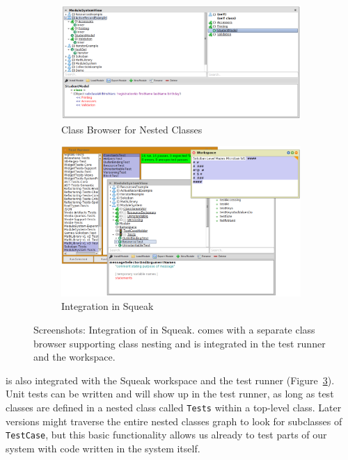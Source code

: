 \begin{figure}[!htp]
	\centering
	\begin{subfigure}[b]{\textwidth}
	\includegraphics[width=\textwidth]{screenshot_classbrowser.png}
	\caption{Class Browser for Nested Classes}
	\label{fig:impl_class_browser}
	\end{subfigure}

	\vspace{20pt}

	\begin{subfigure}[b]{\textwidth}
	\includegraphics[width=\textwidth]{screenshot_integration.png}
	\caption{Integration in Squeak}
	\label{fig:impl_integration}
	\end{subfigure}
	\caption[Screenshots: Integration of \msname in Squeak]{Screenshots: Integration of \msname in Squeak. \msname comes with a separate class browser supporting class nesting and is integrated in the test runner and the workspace.}
\end{figure}

\msname is also integrated with the Squeak workspace and the test runner (Figure~\ref{fig:impl_integration}). Unit tests can be written and will show up in the test runner, as long as test classes are defined in a nested class called \texttt{Tests} within a top-level class. Later versions might traverse the entire nested classes graph to look for subclasses of \texttt{TestCase}, but this basic functionality allows us already to test parts of our system with code written in the system itself.

